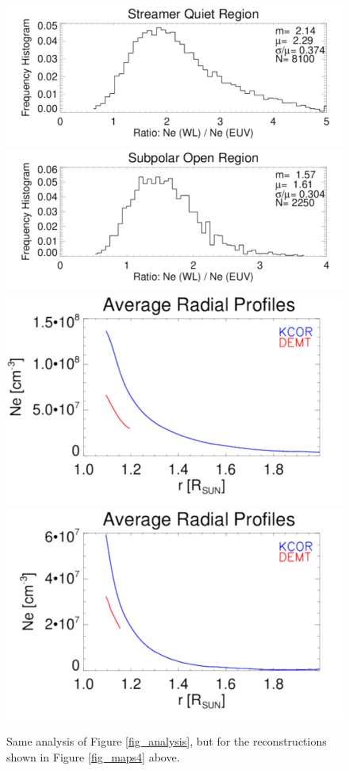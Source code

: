 \documentclass[baaa]{baaa}
\begin{document}
\begin{figure}[!h]
  \centering
  \includegraphics[width=\columnwidth]{comparison_KCOR-Tom_vs_DEMT_CR2198_Lopt_13imag-Quiet-region1_range1105-1195_Rsun.pdf}
  \includegraphics[width=\columnwidth]{comparison_KCOR-Tom_vs_DEMT_CR2198_Lopt_13imag-Open-region_N_range1105-1155_Rsun.pdf}\\
  \includegraphics[width=0.75\columnwidth]{Average_Radial_Profiles_KCOR-Tom_vs_DEMT_CR2198_Lopt_13imag-Quiet-region1.pdf}
  \hskip 2cm
  \includegraphics[width=0.75\columnwidth]{Average_Radial_Profiles_KCOR-Tom_vs_DEMT_CR2198_Lopt_13imag-Open-region_N.pdf}
  \caption{Same analysis of Figure \ref{fig_analysis}, but for the reconstructions shown in Figure \ref{fig_maps4} above.}
  \label{fig_analysis4}
\end{figure}
\end{document}
